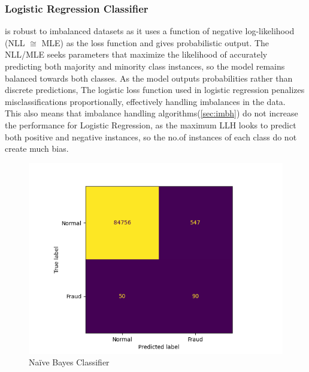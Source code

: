 \documentclass[letterpaper, 11 pt, conference]{ieeeconf}  %
\begin{document}
\subsubsection{Logistic Regression Classifier} is robust to imbalanced datasets as it uses a function of negative log-likelihood (NLL $\cong$ MLE) as the loss function and gives probabilistic output. The NLL/MLE seeks parameters that maximize the likelihood of accurately predicting both majority and minority class instances, so the model remains balanced towards both classes. As the model outputs probabilities rather than discrete predictions, The logistic loss function used in logistic regression penalizes misclassifications proportionally, effectively handling imbalances in the data.\\
This also means that imbalance handling algorithms(\ref{sec:imbh}) do not increase the performance for Logistic Regression, as the maximum LLH looks to predict both positive and negative instances, so the no.of instances of each class do not create much bias.
\begin{figure}[h]
	\centering
	\includegraphics[width=0.92\columnwidth]{Images/GNB_norm_CF.png}
	\caption{Na\"ive Bayes Classifier}
	\label{fig:gnb_CF}
\end{figure}
\end{document}
